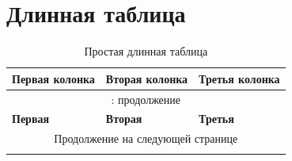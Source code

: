\documentclass[12pt, a4paper]{article}
\begin{document}
\section{Длинная таблица}

\begin{center}
\begin{longtable}{|l|l|l|}
\caption{Простая длинная таблица} \label{tab:long} \\
\hline
\textbf{Первая колонка} & \textbf{Вторая колонка} & \textbf{Третья колонка} \\ \hline 
\endfirsthead

\multicolumn{3}{c}{\tablename{} \thetable{}: продолжение } \\
\hline 
\textbf{Первая}&\textbf{Вторая} & \textbf{Третья} \\
\hline 
\endhead

\hline
\multicolumn{3}{|c|}{Продолжение на следующей странице} \\ \hline
\endfoot
\hline
\endlastfoot



\end{longtable}
\end{center}
\end{document}
